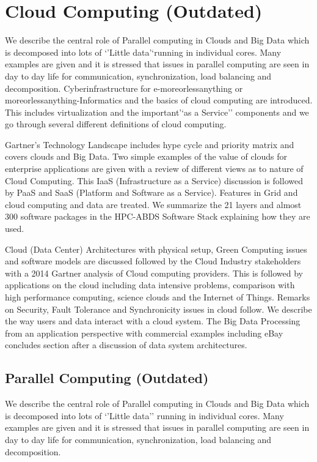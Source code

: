 \FILENAME

\section{Cloud Computing (Outdated)}

We describe the central role of Parallel computing in Clouds and Big
Data which is decomposed into lots of `'Little data'`running in
individual cores. Many examples are given and it is stressed that issues
in parallel computing are seen in day to day life for communication,
synchronization, load balancing and decomposition. Cyberinfrastructure
for e-moreorlessanything or moreorlessanything-Informatics and the
basics of cloud computing are introduced. This includes virtualization
and the important'`as a Service'' components and we go through several
different definitions of cloud computing.

Gartner's Technology Landscape includes hype cycle and priority matrix
and covers clouds and Big Data. Two simple examples of the value of
clouds for enterprise applications are given with a review of different
views as to nature of Cloud Computing. This IaaS (Infrastructure as a
Service) discussion is followed by PaaS and SaaS (Platform and Software
as a Service). Features in Grid and cloud computing and data are
treated. We summarize the 21 layers and almost 300 software packages in
the HPC-ABDS Software Stack explaining how they are used.

Cloud (Data Center) Architectures with physical setup, Green Computing
issues and software models are discussed followed by the Cloud Industry
stakeholders with a 2014 Gartner analysis of Cloud computing providers.
This is followed by applications on the cloud including data intensive
problems, comparison with high performance computing, science clouds and
the Internet of Things. Remarks on Security, Fault Tolerance and
Synchronicity issues in cloud follow. We describe the way users and data
interact with a cloud system. The Big Data Processing from an
application perspective with commercial examples including eBay
concludes section after a discussion of data system architectures.

\subsection{Parallel Computing (Outdated)}

We describe the central role of Parallel computing in Clouds and Big
Data which is decomposed into lots of `'Little data'' running in
individual cores. Many examples are given and it is stressed that issues
in parallel computing are seen in day to day life for communication,
synchronization, load balancing and decomposition.


